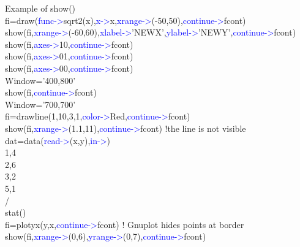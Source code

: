 \begin{example}[showex]Example of \textcolor{VioletRed}{show}()\\
\label{showex}
fi=\textcolor{VioletRed}{draw}(\textcolor{blue}{func->}\textcolor{VioletRed}{sqrt2}(x),\textcolor{blue}{x->}x,\textcolor{blue}{xrange->}(-50,50),\textcolor{blue}{continue->}fcont)\\
\textcolor{VioletRed}{show}(fi,\textcolor{blue}{xrange->}(-60,60),\textcolor{blue}{xlabel->}'NEWX',\textcolor{blue}{ylabel->}'NEWY',\textcolor{blue}{continue->}fcont)\\
\textcolor{VioletRed}{show}(fi,\textcolor{blue}{axes->}10,\textcolor{blue}{continue->}fcont)\\
\textcolor{VioletRed}{show}(fi,\textcolor{blue}{axes->}01,\textcolor{blue}{continue->}fcont)\\
\textcolor{VioletRed}{show}(fi,\textcolor{blue}{axes->}00,\textcolor{blue}{continue->}fcont)\\
Window='400,800'\\
\textcolor{VioletRed}{show}(fi,\textcolor{blue}{continue->}fcont)\\
Window='700,700'\\
fi=\textcolor{VioletRed}{drawline}(1,10,3,1,\textcolor{blue}{color->}Red,\textcolor{blue}{continue->}fcont)\\
\textcolor{VioletRed}{show}(fi,\textcolor{blue}{xrange->}(1.1,11),\textcolor{blue}{continue->}fcont) !the line is not visible\\
dat=\textcolor{VioletRed}{data}(\textcolor{blue}{read->}(x,y),\textcolor{blue}{in->})\\
1,4\\
2,6\\
3,2\\
5,1\\
/\\
\textcolor{VioletRed}{stat}()\\
fi=\textcolor{VioletRed}{plotyx}(y,x,\textcolor{blue}{continue->}fcont)  ! Gnuplot hides points at border\\
\textcolor{VioletRed}{show}(fi,\textcolor{blue}{xrange->}(0,6),\textcolor{blue}{yrange->}(0,7),\textcolor{blue}{continue->}fcont)

\end{example}

